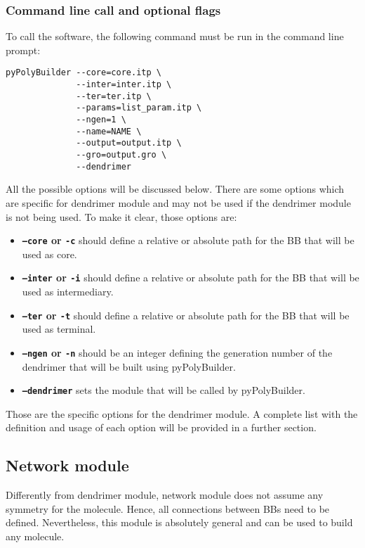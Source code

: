\documentclass[12pt]{article}
\begin{document}
\subsubsection{Command line call and optional flags}

To call the software, the following command must be run in the command line prompt:

\begin{lstlisting}
pyPolyBuilder --core=core.itp \
              --inter=inter.itp \
              --ter=ter.itp \
              --params=list_param.itp \
              --ngen=1 \
              --name=NAME \
              --output=output.itp \
              --gro=output.gro \
              --dendrimer
\end{lstlisting}

All the possible options will be discussed below.
There are some options which are specific for dendrimer module and may not be used if the dendrimer module is not being used.
To make it clear, those options are:

\begin{itemize}
    \item \textbf{\texttt{--core} or \texttt{-c}} should define a relative or absolute path for the BB that will be used as core.
        
    \item \textbf{\texttt{--inter} or \texttt{-i}} should define a relative or absolute path for the BB that will be used as intermediary.
    
    \item \textbf{\texttt{--ter} or \texttt{-t}} should define a relative or absolute path for the BB that will be used as terminal.
    
    \item \textbf{\texttt{--ngen} or \texttt{-n}} should be an integer defining the generation number of the dendrimer that will be built using pyPolyBuilder.
    
    \item \textbf{\texttt{--dendrimer}} sets the module that will be called by pyPolyBuilder.
\end{itemize}

Those are the specific options for the dendrimer module.
A complete list with the definition and usage of each option will be provided in a further section.

\subsection{Network module}
Differently from dendrimer module, network module does not assume any symmetry for the molecule.
Hence, all connections between BBs need to be defined.
Nevertheless, this module is absolutely general and can be used to build any molecule.
\end{document}
